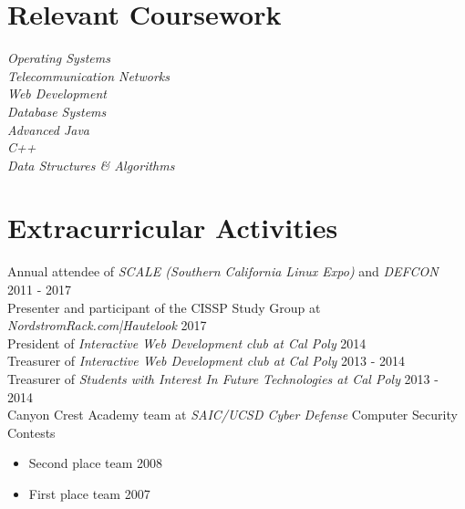\documentclass[line]{tex/res}
\begin{document}
\begin{resume}
\section{Relevant Coursework}
	{\sl Operating Systems } \\
	{\sl Telecommunication Networks } \\
	{\sl Web Development } \\
	{\sl Database Systems } \\
	{\sl Advanced Java} \\
	{\sl C++} \\
	{\sl Data Structures \& Algorithms}

\section{Extracurricular Activities}
    Annual attendee of {\it SCALE (Southern California Linux Expo)} and {\it DEFCON} \hfill 2011 - 2017 \\
    Presenter and participant of the CISSP Study Group at {\it NordstromRack.com|Hautelook} \hfill 2017 \\
	President of {\it Interactive Web Development club at Cal Poly} \hfill 2014 \\
	Treasurer of {\it Interactive Web Development club at Cal Poly} \hfill 2013 - 2014 \\
	Treasurer of {\it Students with Interest In Future Technologies at Cal Poly} \hfill 2013 - 2014 \\
	Canyon Crest Academy team at {\it SAIC/UCSD Cyber Defense} Computer Security Contests
	\begin{itemize} \itemsep -2pt
		\item Second place team \hfill 2008
		\item First place team \hfill 2007
	\end{itemize}

\end{resume}
\end{document}
